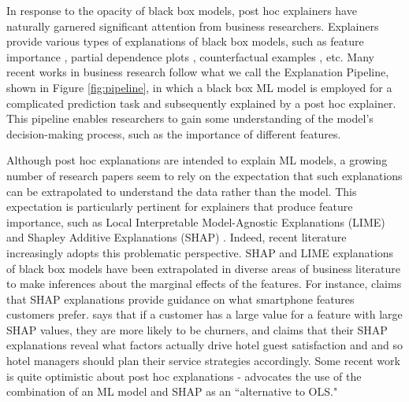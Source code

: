 \documentclass[12pt]{article}  %
\begin{document}
In response to the opacity of black box models, post hoc explainers have naturally garnered significant attention from business researchers. Explainers provide various types of explanations of black box models, such as feature importance \citep{ribeiro16lime,lundberg17shap}, partial dependence plots \citep{friedman01pdp}, counterfactual examples \citep{mothilal20dice}, etc. Many recent works in business research follow what we call the Explanation Pipeline, shown in Figure \ref{fig:pipeline}, in which a black box ML model is employed for a complicated prediction task and subsequently explained by a post hoc explainer. This pipeline enables researchers to gain some understanding of the model's decision-making process, such as the importance of different features. %


Although post hoc explanations are intended to explain ML models, a growing number of research papers seem to rely on the expectation that such explanations can be extrapolated to understand the data rather than the model. This expectation is particularly pertinent for explainers that produce feature importance, such as Local Interpretable Model-Agnostic Explanations (LIME) \citep{ribeiro16lime} and Shapley Additive Explanations (SHAP) \citep{lundberg17shap}.
Indeed, recent literature increasingly adopts this problematic perspective. SHAP and LIME explanations of black box models have been extrapolated in diverse areas of business literature to make inferences about the marginal effects of the features. For instance, \cite{park2024extracting} claims that SHAP explanations provide guidance on what smartphone features customers prefer. \cite{jiang24churn} says that if a customer has a large value for a feature with large SHAP values, they are more likely to be churners, and \cite{sanchez2023role} claims that their SHAP explanations reveal what factors actually drive hotel guest satisfaction and and so hotel managers should plan their service strategies accordingly. Some recent work is quite optimistic about post hoc explanations - \cite{berger2023supply} advocates the use of the combination of an ML model and SHAP as an ``alternative to OLS."
\end{document}
